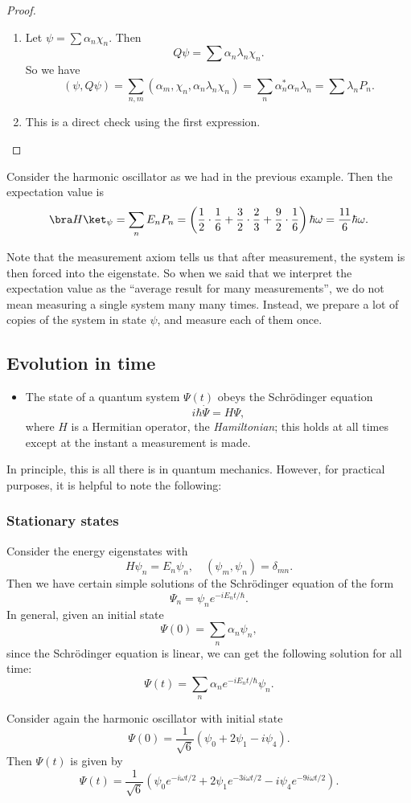 \documentclass[a4paper]{article}
\begin{document}
\begin{proof}\leavevmode
  \begin{enumerate}
    \item Let $\psi = \sum \alpha_n \chi_n$. Then
      \[
        Q \psi = \sum \alpha_n \lambda_n \chi_n.
      \]
      So we have
      \[
        (\psi, Q\psi) = \sum_{n, m}(\alpha_m, \chi_n, \alpha_n \lambda_n \chi_n) = \sum_n \alpha_n^* \alpha_n \lambda_n = \sum \lambda_n P_n.
      \]
    \item This is a direct check using the first expression.
  \end{enumerate}
\end{proof}

\begin{eg}
  Consider the harmonic oscillator as we had in the previous example. Then the expectation value is
  \[
    \bra H\ket_\psi = \sum_n E_n P_n = \left(\frac{1}{2} \cdot \frac{1}{6} + \frac{3}{2} \cdot \frac{2}{3} + \frac{9}{2}\cdot \frac{1}{6}\right)\hbar \omega = \frac{11}{6}\hbar \omega.
  \]
\end{eg}
Note that the measurement axiom tells us that after measurement, the system is then forced into the eigenstate. So when we said that we interpret the expectation value as the ``average result for many measurements'', we do not mean measuring a single system many many times. Instead, we prepare a lot of copies of the system in state $\psi$, and measure each of them once.

\subsection{Evolution in time}
\begin{itemize}
  \item The state of a quantum system $\Psi(t)$ obeys the Schr\"odinger equation
    \[
      i\hbar \dot{\Psi} = H\Psi,
    \]
    where $H$ is a Hermitian operator, the \emph{Hamiltonian}; this holds at all times except at the instant a measurement is made.
\end{itemize}
In principle, this is all there is in quantum mechanics. However, for practical purposes, it is helpful to note the following:

\subsubsection*{Stationary states}
Consider the energy eigenstates with
\[
  H\psi_n = E_n \psi_n,\quad (\psi_m, \psi_n) = \delta_{mn}.
\]
Then we have certain simple solutions of the Schr\"odinger equation of the form
\[
  \Psi_n = \psi_n e^{-iE_n t/\hbar}.
\]
In general, given an initial state
\[
  \Psi(0) = \sum_n \alpha_n \psi_n,
\]
since the Schr\"odinger equation is linear, we can get the following solution for all time:
\[
  \Psi(t) = \sum_n \alpha_n e^{-iE_n t/\hbar} \psi_n.
\]
\begin{eg}
  Consider again the harmonic oscillator with initial state
  \[
    \Psi(0) = \frac{1}{\sqrt{6}}(\psi_0 + 2\psi_1 - i \psi_4).
  \]
  Then $\Psi(t)$ is given by
  \[
    \Psi(t) = \frac{1}{\sqrt{6}} (\psi_0 e^{-i\omega t/2} + 2\psi_1e^{-3i\omega t/2} - i \psi_4 e^{-9i\omega t/2}).
  \]
\end{eg}
\end{document}

